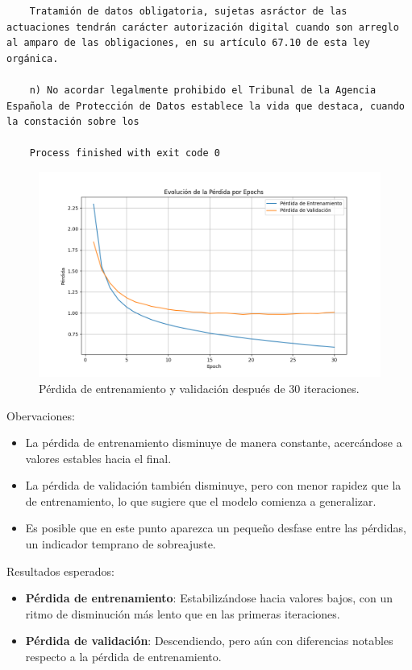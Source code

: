 \documentclass{article}
\begin{document}
{\begin{verbatim}
    Tratamión de datos obligatoria, sujetas asráctor de las actuaciones tendrán carácter autorización digital cuando son arreglo al amparo de las obligaciones, en su artículo 67.10 de esta ley orgánica.
    
    n) No acordar legalmente prohibido el Tribunal de la Agencia Española de Protección de Datos establece la vida que destaca, cuando la constación sobre los
    
    Process finished with exit code 0
\end{verbatim}
}

\newpage

\begin{figure}[H]
    \centering
    \includegraphics[scale=0.4]{30.png}
    \caption{Pérdida de entrenamiento y validación después de 30 iteraciones.}
\end{figure}

{\large{Obervaciones}}:
\begin{itemize}
    \item La pérdida de entrenamiento disminuye de manera constante, acercándose a valores estables hacia el final.
    \item La pérdida de validación también disminuye, pero con menor rapidez que la de entrenamiento, lo que sugiere que el modelo comienza a generalizar.
    \item Es posible que en este punto aparezca un pequeño desfase entre las pérdidas, un indicador temprano de sobreajuste.
\end{itemize}

{\large{Resultados esperados}}:
\begin{itemize}
    \item \textbf{Pérdida de entrenamiento}: Estabilizándose hacia valores bajos, con un ritmo de disminución más lento que en las primeras iteraciones.
    \item \textbf{Pérdida de validación}: Descendiendo, pero aún con diferencias notables respecto a la pérdida de entrenamiento.
\end{itemize}
\end{document}
